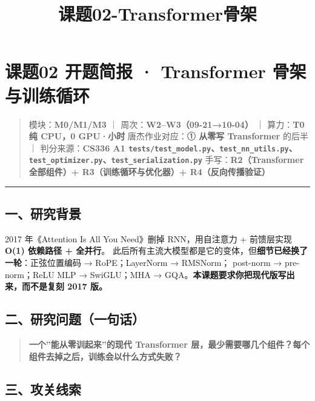 \documentclass[
  chinese,
  11pt,
]{ctexart}
\title{课题02-Transformer骨架}
\author{}
\date{}
\begin{document}
\maketitle

{
\setcounter{tocdepth}{2}
\tableofcontents
}
\section{课题02 开题简报 · Transformer 骨架与训练循环}\label{ux8bfeux989802-ux5f00ux9898ux7b80ux62a5-transformer-ux9aa8ux67b6ux4e0eux8badux7ec3ux5faaux73af}

\begin{quote}
模块：\textbf{M0/M1/M3} ｜ 周次：\textbf{W2--W3（09-21→10-04）} ｜ 算力：\textbf{T0 纯 CPU，0 GPU·小时} 唐杰作业对应：\textbf{① 从零写 Transformer} 的后半 ｜ 判分来源：\textbf{CS336 A1 \texttt{tests/test\_model.py}、\texttt{test\_nn\_utils.py}、\texttt{test\_optimizer.py}、\texttt{test\_serialization.py}} 手写：\textbf{R2（Transformer 全部组件）+ R3（训练循环与优化器）+ R4（反向传播验证）}
\end{quote}

\begin{center}\rule{0.5\linewidth}{0.5pt}\end{center}

\subsection{一、研究背景}\label{ux4e00ux7814ux7a76ux80ccux666f}

2017 年《Attention Is All You Need》删掉 RNN，用自注意力 + 前馈层实现 \textbf{O(1) 依赖路径 + 全并行}。 此后所有主流大模型都是它的变体，但\textbf{细节已经换了一轮}：正弦位置编码 → RoPE；LayerNorm → RMSNorm； post-norm → pre-norm；ReLU MLP → SwiGLU；MHA → GQA。\textbf{本课题要求你把现代版写出来，而不是复刻 2017 版。}

\subsection{二、研究问题（一句话）}\label{ux4e8cux7814ux7a76ux95eeux9898ux4e00ux53e5ux8bdd}

\begin{quote}
\textbf{一个''能从零训起来''的现代 Transformer 层，最少需要哪几个组件？每个组件去掉之后，训练会以什么方式失败？}
\end{quote}

\subsection{三、攻关线索}\label{ux4e09ux653bux5173ux7ebfux7d22}
\end{document}
